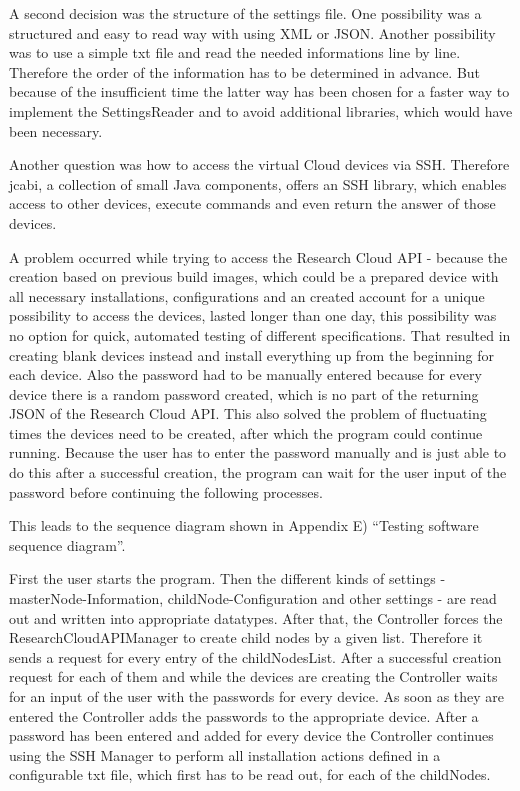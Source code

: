 A second decision was the structure of the settings file. One possibility was a structured and easy to read way with using XML or JSON. Another possibility was to use a simple txt file and read the needed informations line by line. Therefore the order of the information has to be determined in advance. But because of the insufficient time the latter way has been chosen for a faster way to implement the SettingsReader and to avoid additional libraries, which would have been necessary.

Another question was how to access the virtual Cloud devices via SSH. Therefore jcabi, a collection of small Java components, offers an SSH library, which enables access to other devices, execute commands and even return the answer of those devices.

A problem occurred while trying to access the Research Cloud API - because the creation based on previous build images, which could be a prepared device with all necessary installations, configurations and an created account for a unique possibility to access the devices, lasted longer than one day, this possibility was no option for quick, automated testing of different specifications. That resulted in creating blank devices instead and install everything up from the beginning for each device. Also the password had to be manually entered because for every device there is a random password created, which is no part of the returning JSON of the Research Cloud API. This also solved the problem of fluctuating times the devices need to be created, after which the program could continue running. Because the user has to enter the password manually and is just able to do this after a successful creation, the program can wait for the user input of the password before continuing the following processes.

This leads to the sequence diagram shown in Appendix E) ``Testing software sequence diagram''.

First the user starts the program. Then the different kinds of settings - masterNode-Information, childNode-Configuration and other settings - are read out and written into appropriate datatypes. After that, the Controller forces the ResearchCloudAPIManager to create child nodes by a given list. Therefore it sends a request for every entry of the childNodesList. After a successful creation request for each of them and while the devices are creating the Controller waits for an input of the user with the passwords for every device. As soon as they are entered the Controller adds the passwords to the appropriate device. After a password has been entered and added for every device the Controller continues using the SSH Manager to perform all installation actions defined in a configurable txt file, which first has to be read out, for each of the childNodes.

